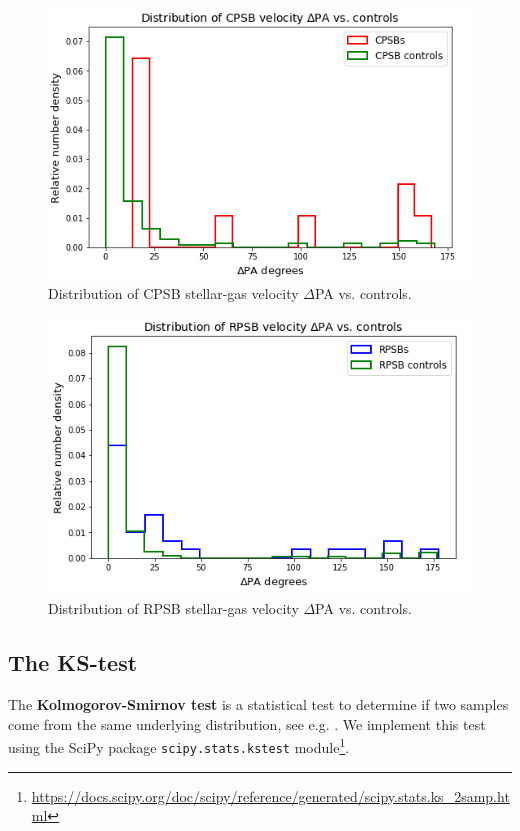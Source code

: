 \begin{figure}
    \centering
    \includegraphics[width=\columnwidth]{images/JupyterPlots/Distribution-of-CPSB-dPA-vs-controls.png}
    \caption{Distribution of CPSB stellar-gas velocity $\Delta$PA vs. controls.}
    \label{fig:CPSBvsControlDeltaPAs}
\end{figure}

\begin{figure}
    \centering
    \includegraphics[width=\columnwidth]{images/JupyterPlots/Distribution-of-RPSB-dPA-vs-controls.png}
    \caption{Distribution of RPSB stellar-gas velocity $\Delta$PA vs. controls.}
    \label{fig:RPSBvsControlDeltaPAs}
\end{figure}




\subsection{The KS-test}
The \textbf{Kolmogorov-Smirnov test} is a statistical test to determine if two samples come from the same underlying distribution, see e.g. \citet{hodges1958significance}. We implement this test using the SciPy package \texttt{scipy.stats.kstest} module\footnote{\href{}{https://docs.scipy.org/doc/scipy/reference/generated/scipy.stats.ks\_2samp.html}}.

